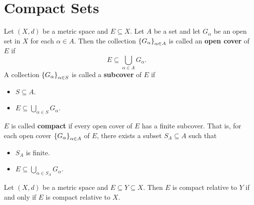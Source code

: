 \section{Compact Sets}

Let $(X, d)$ be a metric space and $E \subseteq X$. Let $A$ be a set and let $G_{\alpha}$
be an open set in $X$ for each $\alpha \in A$. Then the collection
$\set*{G_{\alpha}}_{\alpha \in A}$ is called an \textbf{open cover} of $E$ if
\[
E \subseteq \bigcup_{\alpha \in A} G_{\alpha}.
\]
A collection $\set*{G_{\alpha}}_{\alpha \in S}$ is called a \textbf{subcover} of $E$ if
\begin{itemize}
    \item $S \subseteq A$.
    \item $E \subseteq \bigcup_{\alpha \in S} G_{\alpha}$.
\end{itemize}
$E$ is called \textbf{compact} if every open cover of $E$ has a finite subcover. That is, for each
open cover $\set*{G_{\alpha}}_{\alpha \in A}$ of $E$, there exists a subset $S_{A} \subseteq A$ such that
\begin{itemize}
    \item $S_{A}$ is finite.
    \item $E \subseteq \bigcup_{\alpha \in S_{A}} G_{\alpha}$.
\end{itemize}

\bigskip

\begin{theorem} \label{an:thm:compactness-preserved-under-subspace}
    Let $(X, d)$ be a metric space and $E \subseteq Y \subseteq X$.
    Then $E$ is compact relative to $Y$ if and only if $E$ is compact relative to $X$.
\end{theorem}

